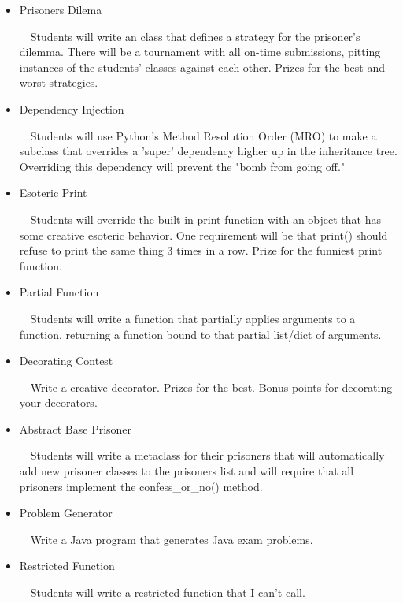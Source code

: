 \documentclass[11pt]{article}
\begin{document}
\begin{itemize} 

\item Prisoners Dilema 

$\ \ \ $ Students will write an class that defines a strategy for the prisoner's dilemma. There will be a tournament with all on-time submissions, pitting instances of the students' classes against each other. Prizes for the best and worst strategies.

\item Dependency Injection 

$\ \ \ $ Students will use Python's Method Resolution Order (MRO) to make a subclass that overrides a 'super' dependency higher up in the inheritance tree. Overriding this dependency will prevent the "bomb from going off."

\item Esoteric Print 

$\ \ \ $ Students will override the built-in print function with an object that has some creative esoteric behavior. One requirement will be that print() should refuse to print the same thing 3 times in a row. Prize for the funniest print function.

\item Partial Function

$\ \ \ $ Students will write a function that partially applies arguments to a function, returning a function bound to that partial list/dict of arguments.

\item Decorating Contest

$\ \ \ $ Write a creative decorator. Prizes for the best. Bonus points for decorating your decorators.

\item Abstract Base Prisoner

$\ \ \ $ Students will write a metaclass for their prisoners that will automatically add new prisoner classes to the prisoners list and will require that all prisoners implement the confess\_or\_no() method.

\item Problem Generator

$\ \ \ $ Write a Java program that generates Java exam problems.

\item Restricted Function

$\ \ \ $ Students will write a restricted function that I can't call.
\end{itemize}
\end{document}
